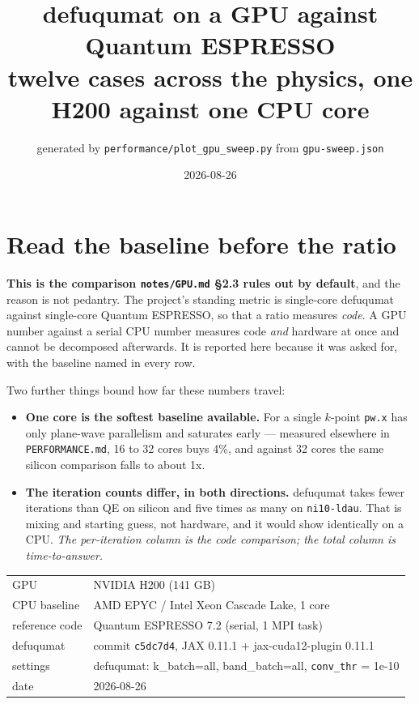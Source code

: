\documentclass[11pt,a4paper]{article}
\title{defuqumat on a GPU against Quantum ESPRESSO\\[3pt]
\large twelve cases across the physics, one H200 against one CPU core}
\author{generated by \texttt{performance/plot\_gpu\_sweep.py} from \texttt{gpu-sweep.json}}
\date{2026-08-26}
\begin{document}
\maketitle

\section*{Read the baseline before the ratio}

\textbf{This is the comparison \texttt{notes/GPU.md} \S2.3 rules out by default}, and the
reason is not pedantry. The project's standing metric is single-core defuqumat
against single-core Quantum ESPRESSO, so that a ratio measures \emph{code}. A GPU
number against a serial CPU number measures code \emph{and} hardware at once and
cannot be decomposed afterwards. It is reported here because it was asked for,
with the baseline named in every row.

Two further things bound how far these numbers travel:

\begin{itemize}
  \item \textbf{One core is the softest baseline available.} For a single
    $k$-point \texttt{pw.x} has only plane-wave parallelism and saturates early
    --- measured elsewhere in \texttt{PERFORMANCE.md}, 16 to 32 cores buys 4\%,
    and against 32 cores the same silicon comparison falls to about 1x.
  \item \textbf{The iteration counts differ, in both directions.} defuqumat takes
    fewer iterations than QE on silicon and five times as many on
    \texttt{ni10-ldau}. That is mixing and starting guess, not hardware, and it
    would show identically on a CPU. \emph{The per-iteration column is the code
    comparison; the total column is time-to-answer.}
\end{itemize}

\begin{center}
\begin{tabular}{ll}
\toprule
GPU & NVIDIA H200 (141 GB) \\
CPU baseline & AMD EPYC / Intel Xeon Cascade Lake, 1 core \\
reference code & Quantum ESPRESSO 7.2 (serial, 1 MPI task) \\
defuqumat & commit \texttt{c5dc7d4}, JAX 0.11.1 + jax-cuda12-plugin 0.11.1 \\
settings & defuqumat: k\_batch=all, band\_batch=all, \texttt{conv\_thr} = 1e-10 \\
date & 2026-08-26 \\
\bottomrule
\end{tabular}
\end{center}
\end{document}
